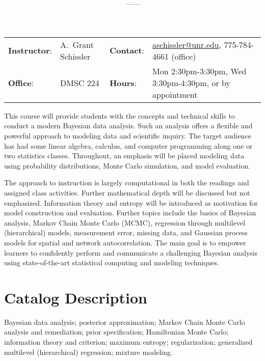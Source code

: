 \documentclass[11pt,onecolumn]{article}
\title{\textbf{\coursename}}
\author{{\semester}---{\roomnumb}---{\classtimes}}
\date{}
\makeatletter
\newcommand{\myname}{A.~Grant Schissler}
\newcommand{\myemail}{aschissler@unr.edu}
\newcommand{\office}{DMSC 224}
\newcommand{\officehours}{Mon 2:30pm-3:30pm, Wed 3:30pm-4:30pm, or by appointment}
\makeatother
\begin{document}
\maketitle

\vspace{-0.25in}
\noindent\makebox[\linewidth]{\rule{\textwidth}{1pt}}

\begin{center}
\begin{tabular}{llll}
\textbf{Instructor}:&\myname & \textbf{Contact}:&\href{mailto:\myemail}{\myemail}, 775-784-4661 (office)\\
\textbf{Office}:&\office & \textbf{Hours}:&\officehours\\
\end{tabular}
\end{center}

This course will provide students with the concepts and technical skills to conduct a modern Bayesian data analysis. Such an analysis offers a flexible and powerful approach to modeling data and scientific inquiry. The target audience has had some linear algebra, calculus, and computer programming along one or two statistics classes. Throughout, an emphasis will be placed modeling data using probability distributions, Monte Carlo simulation, and model evaluation. 

The approach to instruction is largely computational in both the readings and assigned class activities. Further mathematical depth will be discussed but not emphasized. Information theory and entropy will be introduced as motivation for model construction and evaluation. Further topics include the basics of Bayesian analysis, Markov Chain Monte Carlo (MCMC), regression through multilevel (hierarchical) models, measurement error, missing data, and Gaussian process models for spatial and network autocorrelation. The main goal is to empower learners to confidently perform and communicate a challenging Bayesian analysis using state-of-the-art statistical computing and modeling techniques.

\section*{Catalog Description}
Bayesian data analysis; posterior approximation; Markov Chain Monte Carlo analysis and remediation; prior specification; Hamiltonian Monte Carlo; information theory and criterion; maximum entropy; regularization; generalized multilevel (hierarchical) regression; mixture modeling.
\end{document}
